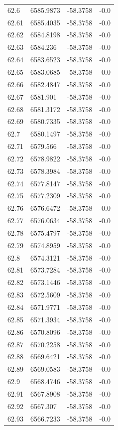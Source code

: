 \begin{table}[H]
\begin{tabular}{llll}
62.6 & 6585.9873 & -58.3758 & -0.0 \\
62.61 & 6585.4035 & -58.3758 & -0.0 \\
62.62 & 6584.8198 & -58.3758 & -0.0 \\
62.63 & 6584.236 & -58.3758 & -0.0 \\
62.64 & 6583.6523 & -58.3758 & -0.0 \\
62.65 & 6583.0685 & -58.3758 & -0.0 \\
62.66 & 6582.4847 & -58.3758 & -0.0 \\
62.67 & 6581.901 & -58.3758 & -0.0 \\
62.68 & 6581.3172 & -58.3758 & -0.0 \\
62.69 & 6580.7335 & -58.3758 & -0.0 \\
62.7 & 6580.1497 & -58.3758 & -0.0 \\
62.71 & 6579.566 & -58.3758 & -0.0 \\
62.72 & 6578.9822 & -58.3758 & -0.0 \\
62.73 & 6578.3984 & -58.3758 & -0.0 \\
62.74 & 6577.8147 & -58.3758 & -0.0 \\
62.75 & 6577.2309 & -58.3758 & -0.0 \\
62.76 & 6576.6472 & -58.3758 & -0.0 \\
62.77 & 6576.0634 & -58.3758 & -0.0 \\
62.78 & 6575.4797 & -58.3758 & -0.0 \\
62.79 & 6574.8959 & -58.3758 & -0.0 \\
62.8 & 6574.3121 & -58.3758 & -0.0 \\
62.81 & 6573.7284 & -58.3758 & -0.0 \\
62.82 & 6573.1446 & -58.3758 & -0.0 \\
62.83 & 6572.5609 & -58.3758 & -0.0 \\
62.84 & 6571.9771 & -58.3758 & -0.0 \\
62.85 & 6571.3934 & -58.3758 & -0.0 \\
62.86 & 6570.8096 & -58.3758 & -0.0 \\
62.87 & 6570.2258 & -58.3758 & -0.0 \\
62.88 & 6569.6421 & -58.3758 & -0.0 \\
62.89 & 6569.0583 & -58.3758 & -0.0 \\
62.9 & 6568.4746 & -58.3758 & -0.0 \\
62.91 & 6567.8908 & -58.3758 & -0.0 \\
62.92 & 6567.307 & -58.3758 & -0.0 \\
62.93 & 6566.7233 & -58.3758 & -0.0 \\

\end{tabular}
\end{table}
